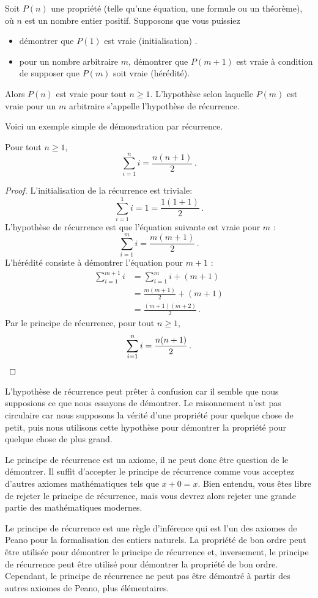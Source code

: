\begin{axiom}
Soit $P(n)$ une propriété (telle qu'une équation, une formule ou un théorème), où $n$ est un nombre entier positif. Supposons que vous puissiez 
\begin{itemize}
\item démontrer que $P(1)$ est vraie (initialisation) .
\item pour un nombre arbitraire $m$, démontrer que $P(m+1)$ est vraie à condition de supposer que $P(m)$ soit vraie (hérédité).
\end{itemize}
Alors $P(n)$ est vraie pour tout $n\geq 1$.
L'hypothèse selon laquelle $P(m)$ est vraie pour un $m$ arbitraire s'appelle l'hypothèse de récurrence.
\end{axiom}
Voici un exemple simple de démonstration par récurrence.
\begin{theorem}\label{t.sum}
Pour tout $n\geq 1$,
\[
\sum_{i=1}^n i = \frac{n(n+1)}{2}\,.
\]
\end{theorem}

\begin{proof} L'initialisation de la récurrence est triviale:
\[
\sum_{i=1}^1 i = 1 =\frac{1(1+1)}{2}\,.
\]
L'hypothèse de récurrence est que l'équation suivante est vraie pour $m$ :
\[
\sum_{i=1}^{m} i = \frac{m(m+1)}{2}\,.
\]
L'hérédité consiste à démontrer l'équation pour $m+1$ :
\begin{align}
\sum_{i=1}^{m+1} i &= \sum_{i=1}^m i + (m+1)\label{l.sum1}\\
&=\frac{m(m+1)}{2} + (m+1)\label{l.sum2}\\
&=\frac{(m+1)(m+2)}{2}\,.\label{l.sum4}
\end{align}
Par le principe de récurrence, pour tout $n\geq 1$,
\[
\sum_{i=1}^n i = \frac{n(n+1)}{2}\,.
\qedhere\]
\end{proof}

L'hypothèse de récurrence peut prêter à confusion car il semble que nous supposions ce que nous essayons de démontrer. Le raisonnement n'est pas circulaire car nous supposons la vérité d'une propriété pour quelque chose de petit, puis nous utilisons cette hypothèse pour démontrer la propriété pour quelque chose de plus grand.

Le principe de  récurrence est un axiome, il ne peut donc être question de le démontrer. Il suffit d'accepter le principe de  récurrence comme vous acceptez d'autres axiomes mathématiques tels que $x+0=x$. Bien entendu, vous êtes libre de rejeter le principe de  récurrence, mais vous devrez alors rejeter une grande partie des mathématiques modernes.
\begin{advanced}
Le principe de  récurrence est une règle d'inférence qui est l'un des axiomes de Peano pour la formalisation des entiers naturels. La propriété de bon ordre peut être utilisée pour démontrer le principe  de récurrence et, inversement, le principe de récurrence peut être utilisé pour démontrer la propriété de bon ordre. Cependant, le principe de récurrence ne peut pas être démontré à partir des autres axiomes de Peano, plus élémentaires.
\end{advanced}

